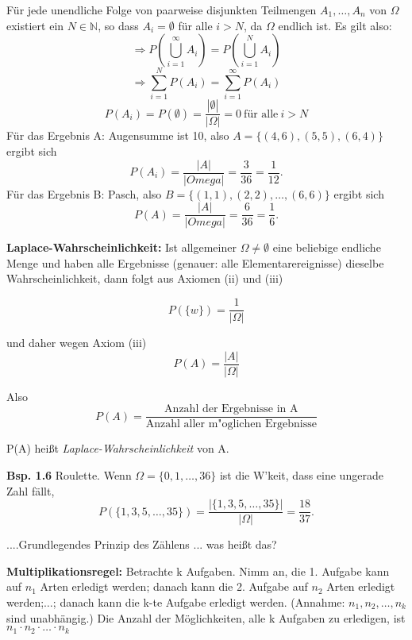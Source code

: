 \documentclass[a4paper,11pt]{article}
\begin{document}
\vspace{2pt}
\noindent Für jede unendliche Folge von paarweise disjunkten Teilmengen $A_1,\dots,A_n$ von $\Omega$ existiert ein $N\in\mathbb{N}$, so dass $A_i=\emptyset$ für alle $i>N$, da $\Omega$ endlich ist.
Es gilt also:
\[\Rightarrow P(\bigcup_{i=1}^{\infty}A_i)=P(\bigcup_{i=1}^{N}A_i)\]
\[\Rightarrow \sum_{i=1}^{N}P(A_i)=\sum_{i=1}^{\infty}P(A_i)\]
\[P(A_i)=P(\emptyset)=\frac{|\emptyset|}{|\Omega|}=0\ \text{für alle}\ i>N\]
\newline Für das Ergebnis A: \glqq Augensumme ist 10\grqq, also $A=\{(4,6),(5,5),(6,4)\}$ ergibt sich \[P(A_i)=\frac{|A|}{|Omega|}=\frac{3}{36}=\frac{1}{12}.\]
\newline Für das Ergebnis B: \glqq Pasch\grqq, also $B=\{(1,1),(2,2),\dots,(6,6)\}$ ergibt sich 
\[P(A)=\frac{|A|}{|Omega|}=\frac{6}{36}=\frac{1}{6}.\]


\vspace{6pt}
\noindent\textbf{Laplace-Wahrscheinlichkeit:} Ist allgemeiner $\Omega \neq \emptyset$ eine beliebige endliche Menge und haben alle Ergebnisse 
(genauer: alle Elementarereignisse) dieselbe Wahrscheinlichkeit, dann folgt aus Axiomen (ii) und (iii)

\[ P(\{w\})=\frac{1}{|\Omega|} \]

\noindent und daher wegen Axiom (iii) \[ P(A)=\frac{|A|}{|\Omega|} \]

\noindent Also \[ P(A)=\frac{\text{Anzahl der Ergebnisse in A}}{\text{Anzahl aller m"oglichen Ergebnisse}} \] 

\noindent P(A) heißt \textit{Laplace-Wahrscheinlichkeit} von A.

\vspace{6pt}
\noindent\textbf{Bsp. 1.6} Roulette.
Wenn $\Omega = \{0,1,\dots,36\} $ ist die W'keit, dass eine ungerade Zahl fällt, \[P(\{1,3,5,\dots,35\})=\frac{|\{1,3,5,\dots,35\}|}{|\Omega|} = \frac{18}{37}.\]

\noindent....Grundlegendes Prinzip des Zählens ... was heißt das?

\vspace{6pt}
\noindent\textbf{Multiplikationsregel:} Betrachte k Aufgaben. Nimm an, die 
1. Aufgabe kann auf $n_1$ Arten erledigt werden; danach kann die 
2. Aufgabe auf $n_2$ Arten erledigt werden;$\dots$; danach kann die 
k-te Aufgabe erledigt werden. (Annahme: $n_1,n_2,\dots,n_k$ sind unabhängig.) 
\newline Die Anzahl der Möglichkeiten, alle k Aufgaben zu erledigen, ist $n_1\cdot n_2\cdot\dots\cdot n_k$
\end{document}
